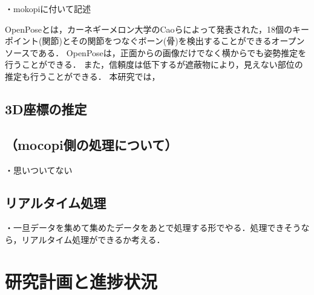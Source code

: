 \documentclass[titlepage]{jarticle}
\begin{document}
・mokopiに付いて記述


OpenPose\cite{openpose}とは，カーネギーメロン大学のCaoらによって発表された，18個のキーポイント(関節)とその関節をつなぐボーン(骨)を検出することができるオープンソースである．
OpenPoseは，正面からの画像だけでなく横からでも姿勢推定を行うことができる．
また，信頼度は低下するが遮蔽物により，見えない部位の推定も行うことができる．
本研究では，%

%
%
\subsection{3D座標の推定}
%

%
%
\subsection{（mocopi側の処理について）}
%
・思いついてない
%
%
\subsection{リアルタイム処理}
%
・一旦データを集めて集めたデータをあとで処理する形でやる．処理できそうなら，リアルタイム処理ができるか考える．
%
%
%

%
%
%
%
%

%
%
%
%
\section{研究計画と進捗状況}
%
\end{document}

